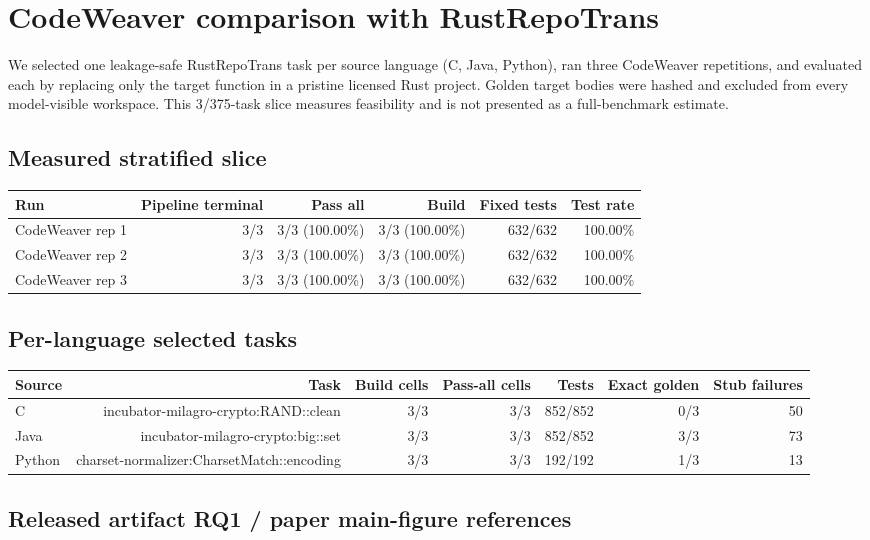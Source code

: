 \documentclass{article}
\begin{document}
\section*{CodeWeaver comparison with RustRepoTrans}

We selected one leakage-safe RustRepoTrans task per source language (C, Java, Python), ran three CodeWeaver repetitions, and evaluated each by replacing only the target function in a pristine licensed Rust project. Golden target bodies were hashed and excluded from every model-visible workspace. This 3/375-task slice measures feasibility and is not presented as a full-benchmark estimate.

\subsection*{Measured stratified slice}

\begin{tabular}{lrrrrr}
\toprule
Run & Pipeline terminal & Pass all & Build & Fixed tests & Test rate \\
\midrule
CodeWeaver rep 1 & 3/3 & 3/3 (100.00\%) & 3/3 (100.00\%) & 632/632 & 100.00\% \\
CodeWeaver rep 2 & 3/3 & 3/3 (100.00\%) & 3/3 (100.00\%) & 632/632 & 100.00\% \\
CodeWeaver rep 3 & 3/3 & 3/3 (100.00\%) & 3/3 (100.00\%) & 632/632 & 100.00\% \\
\bottomrule
\end{tabular}

\subsection*{Per-language selected tasks}

\begin{tabular}{lrrrrrr}
\toprule
Source & Task & Build cells & Pass-all cells & Tests & Exact golden & Stub failures \\
\midrule
C & incubator-milagro-crypto:RAND::clean & 3/3 & 3/3 & 852/852 & 0/3 & 50 \\
Java & incubator-milagro-crypto:big::set & 3/3 & 3/3 & 852/852 & 3/3 & 73 \\
Python & charset-normalizer:CharsetMatch::encoding & 3/3 & 3/3 & 192/192 & 1/3 & 13 \\
\bottomrule
\end{tabular}

\subsection*{Released artifact RQ1 / paper main-figure references}
\end{document}
